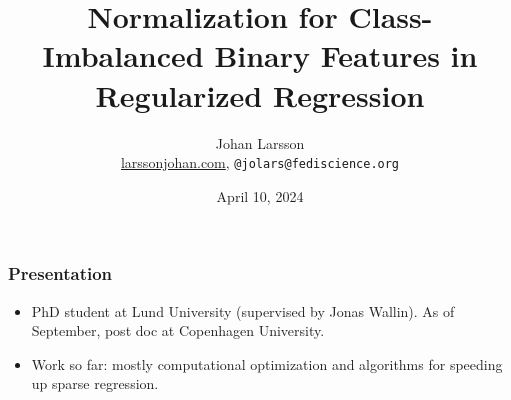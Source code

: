 \documentclass[10pt]{beamer}
\title{Normalization for Class-Imbalanced Binary Features in Regularized Regression}
\author{Johan Larsson\\\smallskip\scriptsize \url{larssonjohan.com}, {\texttt{@jolars@fediscience.org}}}
\institute{Department of Statistics, Lund University}
\date{April 10, 2024}
\begin{document}
\maketitle

\begin{frame}[c]
  \frametitle{Presentation}

  \begin{itemize}
    \item PhD student at Lund University (supervised by Jonas Wallin). As of September, post doc at
          Copenhagen University.
    \item Work so far: mostly computational optimization and algorithms for speeding up sparse
          regression.
  \end{itemize}
\end{frame}
\end{document}
